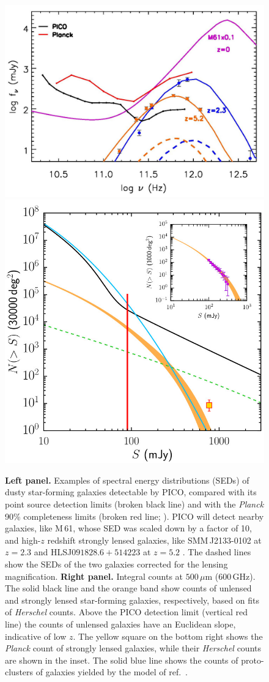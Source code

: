 \documentclass[PICOReport.tex]{subfiles}
\begin{document}
\begin{figure}
\begin{center}
\includegraphics[width=0.43\columnwidth, trim={0 0 0 0cm}, clip]{fig_SED_PICO.jpg}
\includegraphics[width=0.50\columnwidth, height=5.5truecm, trim={0 0 0 0cm}, clip]{NgtF_pico_new.jpg}
\vskip-0.3cm
\caption{\textbf{Left panel.} Examples of spectral energy distributions (SEDs) of dusty star-forming galaxies detectable by PICO, compared with its point source detection limits (broken black line) and with the \textit{Planck} 90\% completeness limits (broken red line; \cite{PCCS2}). PICO will detect nearby galaxies, like M\,61, whose SED was scaled down by a factor of 10, and high-$z$ redshift strongly lensed galaxies, like SMM\,J2133-0102  at $z=2.3$ \cite{Swinbank2010} and HLSJ$091828.6+514223$ at $z=5.2$ \cite{Combes2012}. The dashed  lines show the SEDs of the two galaxies corrected for the lensing magnification.  \textbf{Right panel.} Integral counts at $500\,\mu$m (600\,GHz). The solid black line and the orange band show counts of unlensed and strongly lensed star-forming galaxies, respectively, based on fits of \textit{Herschel} counts. Above the PICO detection limit (vertical red line) the counts of unlensed galaxies have an Euclidean slope, indicative of low $z$. The yellow square on the bottom right shows the \textit{Planck} count of strongly lensed galaxies, while their \textit{Herschel} counts \cite{Negrello2017lensed} are shown in the inset. The solid blue line shows the counts of proto-clusters of galaxies yielded by the model of ref.~\cite{Negrello2017protocl}.}
\label{fig:SED3}
\end{center}
\vspace{-0.15in}
\end{figure}
\end{document}
